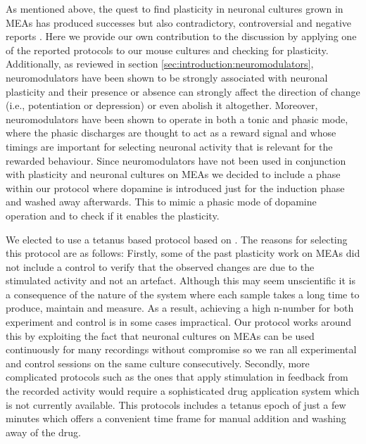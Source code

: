     As mentioned above, the quest to find plasticity in neuronal cultures grown in MEAs has produced successes but also contradictory, controversial and negative reports \cite{wagenaar2006searching,le2009slow}. Here we provide our own contribution to the discussion by applying one of the reported protocols to our mouse cultures and checking for plasticity. Additionally, as reviewed in section \ref{sec:introduction:neuromodulators}, neuromodulators have been shown to be strongly associated with neuronal plasticity and their presence or absence can strongly affect the direction of change (i.e., potentiation or depression) or even abolish it altogether. Moreover, neuromodulators have been shown to operate in both a tonic and phasic mode, where the phasic discharges are thought to act as a reward signal and whose timings are important for selecting neuronal activity that is relevant for the rewarded behaviour. Since neuromodulators have not been used in conjunction with plasticity and neuronal cultures on MEAs we decided to include a phase within our protocol where dopamine is introduced just for the induction phase and washed away afterwards. This to mimic a phasic mode of dopamine operation and to check if it enables the plasticity.

    We elected to use a tetanus based protocol based on \cite{chiappalone2008network}. The reasons for selecting this protocol are as follows: Firstly, some of the past plasticity work on MEAs did not include a control to verify that the observed changes are due to the stimulated activity and not an artefact. Although this may seem unscientific it is a consequence of the nature of the system where each sample takes a long time to produce, maintain and measure. As a result, achieving a high n-number for both experiment and control is in some cases impractical. Our protocol works around this by exploiting the fact that neuronal cultures on MEAs can be used continuously for many recordings without compromise so we ran all experimental and control sessions on the same culture consecutively. Secondly, more complicated protocols such as the ones that apply stimulation in feedback from the recorded activity would require a sophisticated drug application system which is not currently available. This protocols includes a tetanus epoch of just a few minutes which offers a convenient time frame for manual addition and washing away of the drug.

